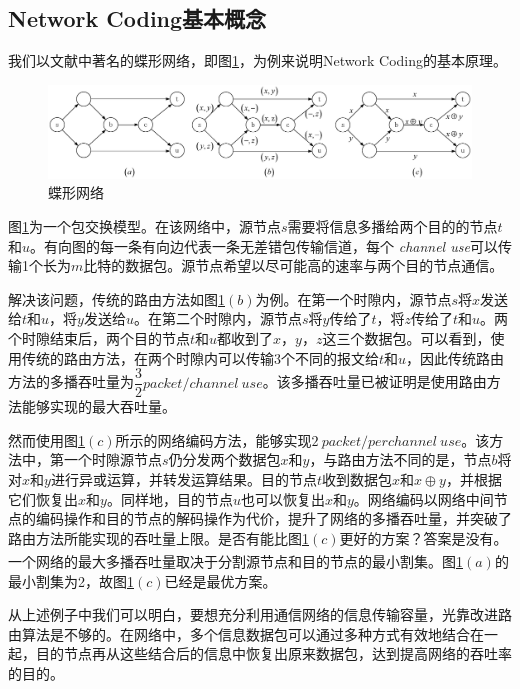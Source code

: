 \subsection{Network Coding基本概念}
我们以文献\cite{Ahlswede2000}中著名的蝶形网络，即图\ref{BUTTER_EPS}，为例来说明Network Coding的基本原理。
\begin{figure}[htbp]
	\centering
	\includegraphics[width=6in]{figures/butter.eps}
	\caption{蝶形网络}
	\label{BUTTER_EPS}
\end{figure}
\par
图\ref{BUTTER_EPS}为一个包交换模型。在该网络中，源节点$s$需要将信息多播给两个目的的节点$t$和$u$。有向图的每一条有向边代表一条无差错包传输信道，每个 \emph{channel use}可以传输1个长为$m$比特的数据包。源节点希望以尽可能高的速率与两个目的节点通信。
\par
解决该问题，传统的路由方法如图\ref{BUTTER_EPS}$(b)$为例。在第一个时隙内，源节点$s$将$x$发送给$t$和$u$，将$y$发送给$u$。在第二个时隙内，源节点$s$将$y$传给了$t$，将$z$传给了$t$和$u$。两个时隙结束后，两个目的节点$t$和$u$都收到了$x$，$y$，$z$这三个数据包。可以看到，使用传统的路由方法，在两个时隙内可以传输3个不同的报文给$t$和$u$，因此传统路由方法的多播吞吐量为$\dfrac{3}{2} packet/channel\ use$。该多播吞吐量已被证明是使用路由方法能够实现的最大吞吐量。
\par
然而使用图\ref{BUTTER_EPS}$(c)$所示的网络编码方法，能够实现$2\ packet/per channel\ use$。该方法中，第一个时隙源节点$s$仍分发两个数据包$x$和$y$，与路由方法不同的是，节点$b$将对$x$和$y$进行异或运算，并转发运算结果。目的节点$t$收到数据包$x$和$x\oplus y$，并根据它们恢复出$x$和$y$。同样地，目的节点$u$也可以恢复出$x$和$y$。网络编码以网络中间节点的编码操作和目的节点的解码操作为代价，提升了网络的多播吞吐量，并突破了路由方法所能实现的吞吐量上限。是否有能比图\ref{BUTTER_EPS}$(c)$更好的方案？答案是没有。一个网络的最大多播吞吐量取决于分割源节点和目的节点的最小割集\textsuperscript{\cite{Ahlswede2000}}。图\ref{BUTTER_EPS}$(a)$的最小割集为2，故图\ref{BUTTER_EPS}$(c)$已经是最优方案。
\par
从上述例子中我们可以明白，要想充分利用通信网络的信息传输容量，光靠改进路由算法是不够的。在网络中，多个信息数据包可以通过多种方式有效地结合在一起，目的节点再从这些结合后的信息中恢复出原来数据包，达到提高网络的吞吐率的目的。
